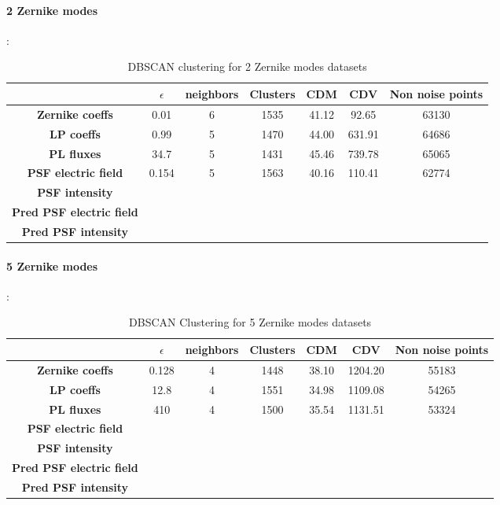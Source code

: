 		\paragraph{2 Zernike modes}:
		\begin{table}[h!]
			\centering
			\begin{tabular}{|c|c|c|c|c|c|c|}
				\hline
				\textbf{} & \textbf{$\epsilon$} & \textbf{neighbors} & \textbf{Clusters} & \textbf{CDM} & \textbf{CDV} & \textbf{Non noise points}\\
				\hline
				\textbf{Zernike coeffs} & 0.01 & 6 & 1535 & 41.12 & 92.65 & 63130 \\
				\hline
				\textbf{LP coeffs} & 0.99 & 5 & 1470 & 44.00 & 631.91 & 64686 \\
				\hline
				\textbf{PL fluxes} & 34.7 & 5 & 1431 & 45.46 & 739.78 & 65065 \\
				\hline
				\textbf{PSF electric field} & 0.154 & 5 & 1563 & 40.16 & 110.41 & 62774 \\
				\hline
				\textbf{PSF intensity} &  &  &  &  &  &  \\
				\hline
				\textbf{Pred PSF electric field} &  &  &  &  &  &  \\
				\hline
				\textbf{Pred PSF intensity} &  &  &  &  &  &  \\
				\hline
			\end{tabular}
		\caption{DBSCAN clustering for 2 Zernike modes datasets}
		\end{table}
		\FloatBarrier
		
		\paragraph{5 Zernike modes}:
		\begin{table}[h!]
			\centering
			\begin{tabular}{|c|c|c|c|c|c|c|}
				\hline
				\textbf{} & \textbf{$\epsilon$} & \textbf{neighbors} & \textbf{Clusters} & \textbf{CDM} & \textbf{CDV} & \textbf{Non noise points}\\
				\hline
				\textbf{Zernike coeffs} & 0.128 & 4 & 1448 & 38.10 & 1204.20 & 55183 \\
				\hline
				\textbf{LP coeffs} & 12.8 & 4 & 1551 & 34.98 & 1109.08 & 54265 \\
				\hline
				\textbf{PL fluxes} & 410 & 4 & 1500 & 35.54 & 1131.51 & 53324 \\
				\hline
				\textbf{PSF electric field} &  &  &  &  &  &  \\
				\hline
				\textbf{PSF intensity} &  &  &  &  &  &  \\
				\hline
				\textbf{Pred PSF electric field} &  &  &  &  &  &  \\
				\hline
				\textbf{Pred PSF intensity} &  &  &  &  &  &  \\
				\hline
			\end{tabular}
		\caption{DBSCAN Clustering for 5 Zernike modes datasets}
		\end{table}
		\FloatBarrier
		
